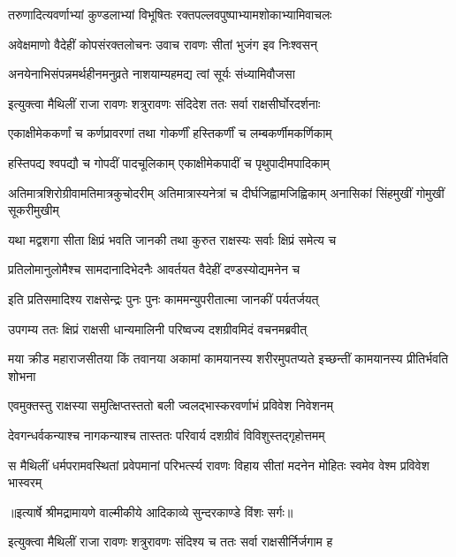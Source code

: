 \twolineshloka
{तरुणादित्यवर्णाभ्यां कुण्डलाभ्यां विभूषितः}
{रक्तपल्लवपुष्पाभ्यामशोकाभ्यामिवाचलः} %

\twolineshloka
{अवेक्षमाणो वैदेहीं कोपसंरक्तलोचनः}
{उवाच रावणः सीतां भुजंग इव निःश्वसन्} %

\twolineshloka
{अनयेनाभिसंपन्नमर्थहीनमनुव्रते}
{नाशयाम्यहमद्य त्वां सूर्यः संध्यामिवौजसा} %

\twolineshloka
{इत्युक्त्वा मैथिलीं राजा रावणः शत्रुरावणः}
{संदिदेश ततः सर्वा राक्षसीर्घोरदर्शनाः} %

\twolineshloka
{एकाक्षीमेककर्णां च कर्णप्रावरणां तथा}
{गोकर्णीं हस्तिकर्णीं च लम्बकर्णीमकर्णिकाम्} %

\twolineshloka
{हस्तिपद्य श्वपद्यौ च गोपदीं पादचूलिकाम्}
{एकाक्षीमेकपादीं च पृथुपादीमपादिकाम्} %

\threelineshloka
{अतिमात्रशिरोग्रीवामतिमात्रकुचोदरीम्}
{अतिमात्रास्यनेत्रां च दीर्घजिह्वामजिह्विकाम्}
{अनासिकां सिंहमुखीं गोमुखीं सूकरीमुखीम्} %

\twolineshloka
{यथा मद्वशगा सीता क्षिप्रं भवति जानकी}
{तथा कुरुत राक्षस्यः सर्वाः क्षिप्रं समेत्य च} %

\twolineshloka
{प्रतिलोमानुलोमैश्च सामदानादिभेदनैः}
{आवर्तयत वैदेहीं दण्डस्योद्यमनेन च} %

\twolineshloka
{इति प्रतिसमादिश्य राक्षसेन्द्रः पुनः पुनः}
{काममन्युपरीतात्मा जानकीं पर्यतर्जयत्} %

\twolineshloka
{उपगम्य ततः क्षिप्रं राक्षसी धान्यमालिनी}
{परिष्वज्य दशग्रीवमिदं वचनमब्रवीत्} %

\threelineshloka
{मया क्रीड महाराजसीतया किं तवानया}
{अकामां कामयानस्य शरीरमुपतप्यते}
{इच्छन्तीं कामयानस्य प्रीतिर्भवति शोभना} %

\twolineshloka
{एवमुक्तस्तु राक्षस्या समुत्क्षिप्तस्ततो बली}
{ज्वलद्भास्करवर्णाभं प्रविवेश निवेशनम्} %

\twolineshloka
{देवगन्धर्वकन्याश्च नागकन्याश्च तास्ततः}
{परिवार्य दशग्रीवं विविशुस्तद्गृहोत्तमम्} %

\fourlineindentedshloka
{स मैथिलीं धर्मपरामवस्थितां}
{ प्रवेपमानां परिभर्त्स्य रावणः}
{विहाय सीतां मदनेन मोहितः}
{ स्वमेव वेश्म प्रविवेश भास्वरम्} %


{॥इत्यार्षे श्रीमद्रामायणे वाल्मीकीये आदिकाव्ये सुन्दरकाण्डे विंशः सर्गः॥}


\twolineshloka
{इत्युक्त्वा मैथिलीं राजा रावणः शत्रुरावणः}
{संदिश्य च ततः सर्वा राक्षसीर्निर्जगाम ह} %

